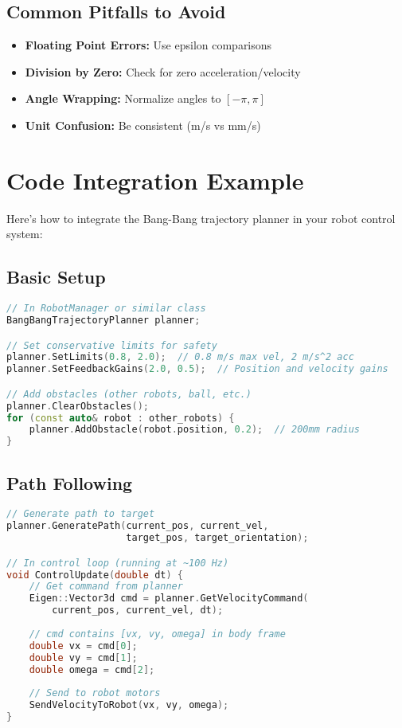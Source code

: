 \documentclass[12pt,a4paper]{article}
\begin{document}
\subsection{Common Pitfalls to Avoid}

\begin{itemize}
    \item \textbf{Floating Point Errors:} Use epsilon comparisons
    \item \textbf{Division by Zero:} Check for zero acceleration/velocity
    \item \textbf{Angle Wrapping:} Normalize angles to $[-\pi, \pi]$
    \item \textbf{Unit Confusion:} Be consistent (m/s vs mm/s)
\end{itemize}

\section{Code Integration Example}

Here's how to integrate the Bang-Bang trajectory planner in your robot control system:

\subsection{Basic Setup}
\begin{lstlisting}[language=C++, caption=Setting up the planner]
// In RobotManager or similar class
BangBangTrajectoryPlanner planner;

// Set conservative limits for safety
planner.SetLimits(0.8, 2.0);  // 0.8 m/s max vel, 2 m/s^2 acc
planner.SetFeedbackGains(2.0, 0.5);  // Position and velocity gains

// Add obstacles (other robots, ball, etc.)
planner.ClearObstacles();
for (const auto& robot : other_robots) {
    planner.AddObstacle(robot.position, 0.2);  // 200mm radius
}
\end{lstlisting}

\subsection{Path Following}
\begin{lstlisting}[language=C++, caption=Following the trajectory]
// Generate path to target
planner.GeneratePath(current_pos, current_vel, 
                     target_pos, target_orientation);

// In control loop (running at ~100 Hz)
void ControlUpdate(double dt) {
    // Get command from planner
    Eigen::Vector3d cmd = planner.GetVelocityCommand(
        current_pos, current_vel, dt);
    
    // cmd contains [vx, vy, omega] in body frame
    double vx = cmd[0];
    double vy = cmd[1]; 
    double omega = cmd[2];
    
    // Send to robot motors
    SendVelocityToRobot(vx, vy, omega);
}
\end{lstlisting}
\end{document}
